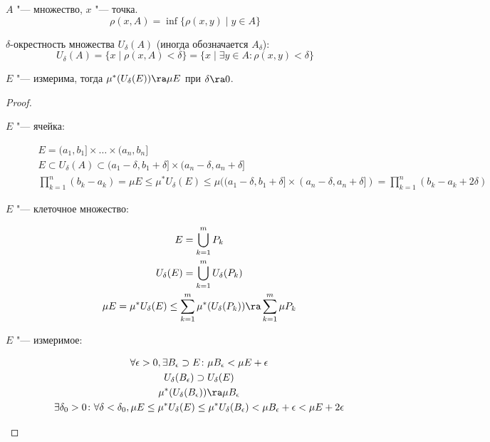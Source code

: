 
\begin{Def}
	$A$ "--- множество, $x$ "--- точка.
	\[ \rho(x, A) = \inf \{\rho(x, y) \mid y \in A \} \]
\end{Def}

\begin{Def}
	$\delta$-окрестность множества $U_\delta(A)$ (иногда обозначается $A_\delta$):
	\[ U_\delta(A) = \{ x \mid \rho(x, A) < \delta\} = \{x \mid \exists y \in A\colon \rho(x, y) < \delta\} \]
\end{Def}

\begin{theorem}
	$E$ "--- измерима, тогда $\mu^*(U_\delta(E)) \ra \mu E$ при $\delta \ra 0$.
\end{theorem}
\begin{proof}
	\begin{description}
	\item[$E$ "--- ячейка:]
		\begin{gather*}
			E = (a_1, b_1] \times \dots \times (a_n, b_n] \\
			E \subset U_\delta(A) \subset (a_1 - \delta, b_1 + \delta] \times (a_n - \delta, a_n + \delta] \\
			\prod_{k=1}^n (b_k - a_k) = \mu E \le \mu^* U_\delta(E) \le \mu((a_1 - \delta, b_1 + \delta] \times (a_n - \delta, a_n + \delta])
			= \prod_{k=1}^n (b_k - a_k + 2\delta)
		\end{gather*}

	\item[$E$ "--- клеточное множество:]
		\begin{gather*}
			E = \bigcup_{k=1}^m P_k \\
			U_\delta(E) = \bigcup_{k=1}^m U_\delta(P_k) \\
			\mu E = \mu^* U_\delta(E) \le \sum_{k=1}^m \mu^*(U_\delta(P_k)) \ra \sum_{k=1}^m \mu P_k
		\end{gather*}

	\item[$E$ "--- измеримое:]
		\begin{gather*}
			\forall \epsilon > 0, \exists B_\epsilon \supset E\colon \mu B_\epsilon < \mu E + \epsilon \\
			U_\delta(B_\epsilon) \supset U_\delta(E) \\
			\mu^*(U_\delta(B_\epsilon)) \ra \mu B_\epsilon \\
			\exists \delta_0 > 0\colon \forall \delta < \delta_0, \mu E \le \mu^* U_\delta(E) \le \mu^* U_\delta(B_\epsilon) < \mu B_\epsilon + \epsilon < \mu E + 2 \epsilon
		\end{gather*}
	\end{description}
\end{proof}

